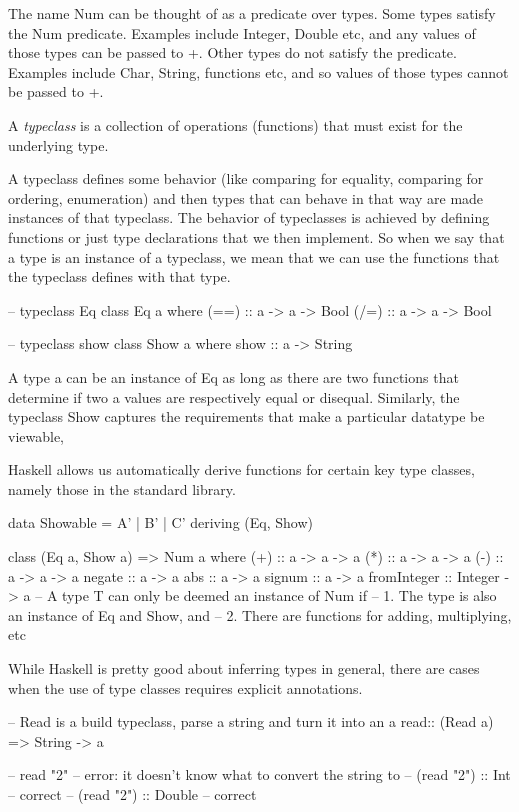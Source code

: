 The name Num can be thought of as a predicate over types. 
Some types satisfy the Num predicate. Examples include Integer, Double etc, and any values of those types can be passed to +. 
Other types do not satisfy the predicate. Examples include Char, String, functions etc, and 
so values of those types cannot be passed to +.

A \textit{typeclass} is a collection of operations (functions) that must exist for the underlying type.

A typeclass defines some behavior (like comparing for equality, comparing for ordering, enumeration) and then types that can behave in that way are made instances of that typeclass. The behavior of typeclasses is achieved by defining functions or just type declarations that we then implement. So when we say that a type is an instance of a typeclass, we mean that we can use the functions that the typeclass defines with that type.




\begin{haskellcode}
-- typeclass Eq
class  Eq a  where
  (==) :: a -> a -> Bool
  (/=) :: a -> a -> Bool

-- typeclass show
class  Show a  where
  show :: a -> String
\end{haskellcode}
A type a can be an instance of Eq as long as there are two functions 
that determine if two a values are respectively equal or disequal. 
Similarly, the typeclass Show captures the requirements that make a particular datatype be viewable,

Haskell allows us automatically derive functions for certain key type classes, namely those in the standard library.
\begin{haskellcode}
data Showable = A' | B' | C' deriving (Eq, Show)

class (Eq a, Show a) => Num a where
    (+) :: a -> a -> a
    (*) :: a -> a -> a
    (-) :: a -> a -> a
    negate :: a -> a
    abs :: a -> a
    signum :: a -> a
    fromInteger :: Integer -> a
-- A type T can only be deemed an instance of Num if
--     1. The type is also an instance of Eq and Show, and
--     2. There are functions for adding, multiplying, etc
\end{haskellcode}

While Haskell is pretty good about inferring types in general, 
there are cases when the use of type classes requires explicit annotations.
\begin{haskellcode}
-- Read is a build typeclass, parse a string and turn it into an a
read:: (Read a) => String -> a

-- read "2" -- error: it doesn’t know what to convert the string to
-- (read "2") :: Int -- correct
-- (read "2") :: Double -- correct
\end{haskellcode}


